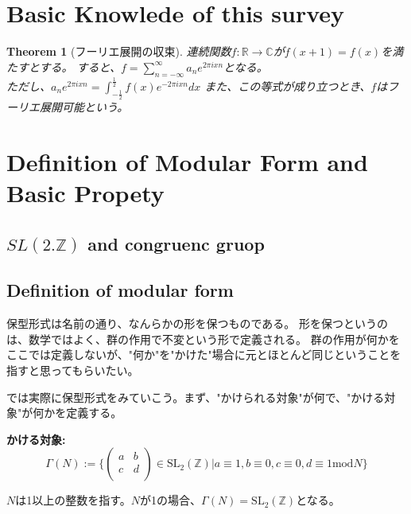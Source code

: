 \documentclass{ujarticle}
\newtheorem{thm}{Theorem}[section]
\begin{document}
\section{Basic Knowlede of this survey}
\label{sec:Basic Knowlede of this survey}

\begin{thm}[フーリエ展開の収束]
\label{thm:fourier}
 連続関数$f:\mathbb{R} \to \mathbb{C}$が$f(x + 1) = f(x)$を満たすとする。
 すると、$f= \displaystyle  \sum_{n= - \infty }^{\infty}a_ne^{2 \pi i x n}$となる。\\
 ただし、$a_n e^{2 \pi i x n}= \int_{-\frac{1}{2}}^{\frac{1}{2}}f(x)e^{-2 \pi i x n}dx$
また、この等式が成り立つとき、$f$はフーリエ展開可能という。
\end{thm}

\section{Definition of Modular Form and Basic Propety}
\label{sec:Modular Form}

\subsection{$SL(2.\mathbb{Z})$ and congruenc gruop}
\label{sub:$SL(2.Z and congurenc gruop}


\subsection{Definition of modular form}
\label{sub:Definition of modular form}
保型形式は名前の通り、なんらかの形を保つものである。
形を保つというのは、数学ではよく、群の作用で不変という形で定義される。
群の作用が何かをここでは定義しないが、"何か"を"かけた"場合に元とほとんど同じということを指すと思ってもらいたい。

\noindent では実際に保型形式をみていこう。まず、"かけられる対象"が何で、"かける対象"が何かを定義する。

\noindent \bf{かける対象:}
\begin{equation*}
  \Gamma(N) := \{
  \begin{pmatrix}
    a & b \\
    c & d \\
  \end{pmatrix}
  \in \mathrm{SL}_2(\mathbb{Z}) | a \equiv 1,b \equiv 0,c \equiv 0, d \equiv 1 \mathrm{mod} N
  \}
\end{equation*}
\begin{center}
  $N$は1以上の整数を指す。$N$が1の場合、$\Gamma(N) = \mathrm{SL_2(\mathbb{Z})}$となる。
\end{center}
\end{document}

